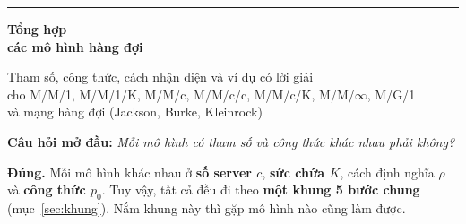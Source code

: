 \documentclass[11pt,a4paper]{article}
\begin{document}
\begin{titlepage}
\thispagestyle{empty}
\vspace*{3.2cm}
{\color{accent}\rule{0.35\linewidth}{2pt}}\par\vspace{1.4em}
{\sffamily\bfseries\fontsize{34}{40}\selectfont\color{ink} Tổng hợp\\[0.15em] các mô hình hàng đợi\par}
\vspace{1.4em}
{\large Tham số, công thức, cách nhận diện và ví dụ có lời giải\\
cho M/M/1, M/M/1/K, M/M/c, M/M/c/c, M/M/c/K, M/M/$\infty$, M/G/1\\
và mạng hàng đợi (Jackson, Burke, Kleinrock)\par}
\vfill
\begin{tcolorbox}[common,colback=accentsoft,colframe=accent,width=\linewidth]
\textbf{Câu hỏi mở đầu:} \emph{Mỗi mô hình có tham số và công thức khác nhau phải không?}\par
\textbf{Đúng.} Mỗi mô hình khác nhau ở \textbf{số server $c$}, \textbf{sức chứa $K$}, cách định nghĩa \textbf{$\rho$} và \textbf{công thức $p_0$}. Tuy vậy, tất cả đều đi theo \textbf{một khung 5 bước chung} (mục~\ref{sec:khung}). Nắm khung này thì gặp mô hình nào cũng làm được.
\end{tcolorbox}
\vspace{1cm}
\end{titlepage}

\tableofcontents
\newpage








\end{document}
